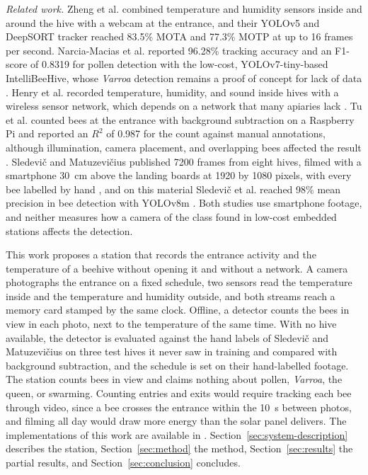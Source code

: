 \documentclass[english,hidelinks]{sbrt}
\begin{document}
\textit{Related work.} Zheng et al. combined temperature and humidity sensors inside and around the hive with a webcam at the entrance, and their YOLOv5 and DeepSORT tracker reached 83.5\% MOTA and 77.3\% MOTP at up to 16 frames per second. Narcia-Macias et al. reported 96.28\% tracking accuracy and an F1-score of 0.8319 for pollen detection with the low-cost, YOLOv7-tiny-based IntelliBeeHive, whose \textit{Varroa} detection remains a proof of concept for lack of data \cite{zheng2024intelligent,narciamacias2024intellibeehive}. Henry et al. recorded temperature, humidity, and sound inside hives with a wireless sensor network, which depends on a network that many apiaries lack \cite{henry2019precision}. Tu et al. counted bees at the entrance with background subtraction on a Raspberry Pi and reported an $R^2$ of 0.987 for the count against manual annotations, although illumination, camera placement, and overlapping bees affected the result \cite{tu2016automatic}. Sledevi\v{c} and Matuzevi\v{c}ius published 7200 frames from eight hives, filmed with a smartphone 30~cm above the landing boards at 1920 by 1080 pixels, with every bee labelled by hand \cite{sledevic2024dataset}, and on this material Sledevi\v{c} et al. reached 98\% mean precision in bee detection with YOLOv8m \cite{sledevic2025behavior}. Both studies use smartphone footage, and neither measures how a camera of the class found in low-cost embedded stations affects the detection.

This work proposes a station that records the entrance activity and the temperature of a beehive without opening it and without a network. A camera photographs the entrance on a fixed schedule, two sensors read the temperature inside and the temperature and humidity outside, and both streams reach a memory card stamped by the same clock. Offline, a detector counts the bees in view in each photo, next to the temperature of the same time. With no hive available, the detector is evaluated against the hand labels of Sledevi\v{c} and Matuzevi\v{c}ius on three test hives it never saw in training and compared with background subtraction, and the schedule is set on their hand-labelled footage. The station counts bees in view and claims nothing about pollen, \textit{Varroa}, the queen, or swarming. Counting entries and exits would require tracking each bee through video, since a bee crosses the entrance within the 10~s between photos, and filming all day would draw more energy than the solar panel delivers. The implementations of this work are available in \cite{repo}. Section~\ref{sec:system-description} describes the station, Section~\ref{sec:method} the method, Section~\ref{sec:results} the partial results, and Section~\ref{sec:conclusion} concludes.
\end{document}
